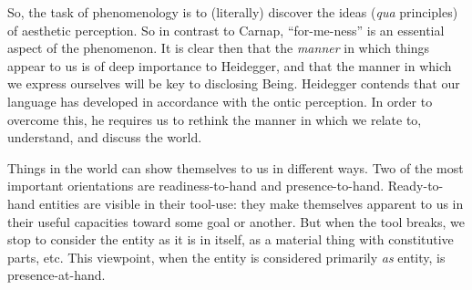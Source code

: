 \documentclass[leqno, 12pt]{turabian-researchpaper}
\begin{document}
	So, the task of phenomenology is to (literally) discover the ideas (\textit{qua}
	principles) of aesthetic perception. So in contrast to Carnap, \enquote{for-me-ness}
	is an essential aspect of the phenomenon. It is clear then that the \textit{manner}
	in which things appear to us is of deep importance to Heidegger, and that the manner
	in which we express ourselves will be key to disclosing Being. Heidegger
	contends that our language has developed in accordance with the ontic
	perception. In order to overcome this, he requires us to rethink the manner in
	which we relate to, understand, and discuss the world.


	Things in the world can show themselves to us in different ways. Two of the
	most important orientations are readiness-to-hand and presence-to-hand. Ready-to-hand
	entities are visible in their tool-use: they make themselves apparent to us in
	their useful capacities toward some goal or another. But when the tool breaks,
	we stop to consider the entity as it is in itself, as a material thing with constitutive
	parts, etc. This viewpoint, when the entity is considered primarily \emph{as} entity,
	is presence-at-hand.
\end{document}

